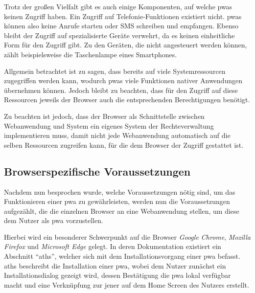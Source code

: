 \documentclass[12pt, parskip=half]{scrartcl}       %
\begin{document}
Trotz der großen Vielfalt gibt es auch einige Komponenten, auf welche \acp{pwa} keinen Zugriff haben.
Ein Zugriff auf Telefonie-Funktionen existiert nicht.
\acp{pwa} können also keine Anrufe starten oder SMS schreiben und empfangen.
Ebenso bleibt der Zugriff auf spezialisierte Geräte verwehrt, da es keinen einheitliche Form für den Zugriff gibt.
Zu den Geräten, die nicht angesteuert werden können, zählt beispielsweise die Taschenlampe eines Smartphones.

Allgemein betrachtet ist zu sagen, dass bereits auf viele Systemressourcen zugegriffen werden kann, wodurch \acp{pwa} viele Funktionen nativer Anwendungen übernehmen können.
Jedoch bleibt zu beachten, dass für den Zugriff auf diese Ressourcen jeweils der Browser auch die entsprechenden Berechtigungen benötigt.

Zu beachten ist jedoch, dass der Browser als Schnittstelle zwischen Webanwendung und System ein eigenes System der Rechteverwaltung implementieren muss, damit nicht jede Webanwendung automatisch auf die selben Ressourcen zugreifen kann, für die dem Browser der Zugriff gestattet ist.


\subsection{Browserspezifische Voraussetzungen}

Nachdem nun besprochen wurde, welche Voraussetzungen nötig sind, um das Funktionieren einer \ac{pwa} zu gewährleisten, werden nun die Voraussetzungen aufgezählt, die die einzelnen Browser an eine Webanwendung stellen, um diese dem Nutzer als \ac{pwa} vorzustellen.

Hierbei wird ein besonderer Schwerpunkt auf die Browser \textit{Google Chrome}, \textit{Mozilla Firefox} und \textit{Microsoft Edge} gelegt.
In deren Dokumentation\cite{googledev_pwainstallcriteria,docsmicrosoft_pwainstallcriteria,mozilladev_pwainstallcriteria} existiert ein Abschnitt \enquote{\ac{aths}}, welcher sich mit dem Installationsvorgang einer \ac{pwa} befasst.
\ac{aths} beschreibt die Installation einer \ac{pwa}, wobei dem Nutzer zunächst ein Installationsdialog gezeigt wird, dessen Bestätigung die \ac{pwa} lokal verfügbar macht und eine Verknüpfung zur jener auf dem Home Screen des Nutzers erstellt.
\end{document}
